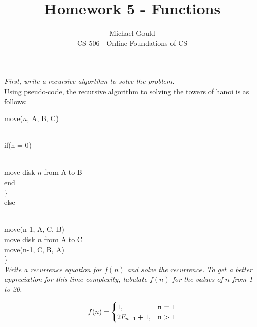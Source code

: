 \documentclass[10pt]{article}
\newcommand\tab[1][1cm]{\hspace*{#1}}
\begin{document}
\title{Homework 5 - Functions}
\author{Michael Gould\\ 
CS 506 - Online Foundations of CS}

\maketitle
\textit{First, write a recursive algortihm to solve the problem.}\\

Using pseudo-code, the recursive algorithm to solving the towers of hanoi is as follows:

move($n$, A, B, C){\\
\tab if(n = 0){\\
\tab\tab move disk $n$ from A to B\\
\tab\tab end\\
\tab\}\\
\tab else {\\
\tab\tab move(n-1, A, C, B)\\
\tab\tab move disk $n$ from A to C\\
\tab\tab move(n-1, C, B, A)\\
\tab\}\\

\textit{Write a recurrence equation for $f(n)$ and solve the
recurrence. To get a better appreciation for this time complexity, tabulate $f(n)$ for the values of $n$ from 1
to 20.}

\begin{equation}
  f(n)=\begin{cases}
    1, & $n = 1$\\
    2F_{n-1} + 1, & $n $>$ 1$\\
  \end{cases}
\end{equation}

}}}
\end{document}
